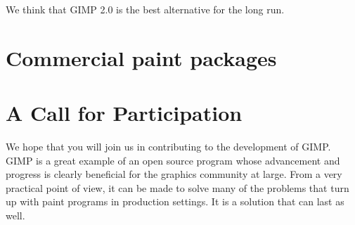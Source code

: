 We think that GIMP 2.0 is the best alternative for the long run.

\section{Commercial paint packages}


\section{A Call for Participation}

We hope that you will join us in contributing to
the development of GIMP. GIMP is a great example
of an open source program whose advancement and
progress is clearly beneficial for the graphics
community at large. From a very practical point of
view, it can be made to solve many of the problems
that turn up with paint programs in production
settings. It is a solution that can last as well.
